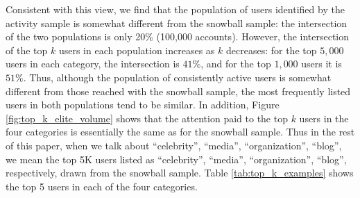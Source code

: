 \documentclass[phd,tocprelim]{cornell}
\begin{document}
Consistent with this view, we find that the population of users identified
by the activity sample is somewhat different from the snowball sample: the
intersection of the two populations is only 20$\%$ (100,000
accounts). However, the intersection of the top $k$ users in each
population increases as $k$ decreases: for the top $5,000$ users in each
category, the intersection is $41\%$, and for the top $1,000$ users it is
$51\%$. Thus, although the population of consistently active users is
somewhat different from those reached with the snowball sample, the most
frequently listed users in both populations tend to be similar. In
addition, Figure \ref{fig:top_k_elite_volume} shows that the attention paid
to the top $k$ users in the four categories is essentially the same as for
the snowball sample.  Thus in the rest of this paper, when we talk about
``celebrity'', ``media'', ``organization'', ``blog'', we mean the top 5K
users listed as ``celebrity'', ``media'', ``organization'', ``blog'',
respectively, drawn from the snowball sample. Table
\ref{tab:top_k_examples} shows the top 5 users in each of
the four categories.


\end{document}
